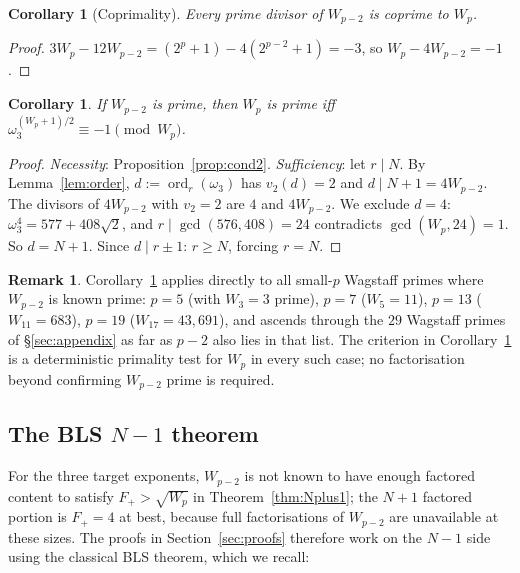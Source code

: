\documentclass[11pt,a4paper]{amsart}
\theoremstyle{plain}
\newtheorem{corollary}[theorem]{Corollary}
\theoremstyle{definition}
\newtheorem{remark}[theorem]{Remark}
\DeclareMathOperator{\ord}{ord}
\newcommand{\wom}{\omega_3}
\newcommand{\sqrttwo}{\sqrt{2}}
\begin{document}
\begin{corollary}[Coprimality]
\label{cor:coprime}
Every prime divisor of $W_{p-2}$ is coprime to $W_p$.
\end{corollary}

\begin{proof}
$3 W_p - 12 W_{p-2} = (2^p + 1) - 4(2^{p-2} + 1) = -3$, so $W_p - 4
W_{p-2} = -1$.
\end{proof}

\begin{corollary}
\label{cor:small-p-specialisation}
If $W_{p-2}$ is prime, then $W_p$ is prime iff $\wom^{(W_p + 1)/2}
\equiv -1 \pmod{W_p}$.
\end{corollary}

\begin{proof}
\emph{Necessity}: Proposition~\ref{prop:cond2}. \emph{Sufficiency}: let
$r \mid N$. By Lemma~\ref{lem:order}, $d := \ord_r(\wom)$ has
$v_2(d) = 2$ and $d \mid N+1 = 4 W_{p-2}$. The divisors of $4 W_{p-2}$
with $v_2 = 2$ are $4$ and $4 W_{p-2}$. We exclude $d = 4$: $\wom^4
= 577 + 408\sqrttwo$, and $r \mid \gcd(576, 408) = 24$ contradicts
$\gcd(W_p, 24) = 1$. So $d = N + 1$. Since $d \mid r \pm 1$: $r \geq
N$, forcing $r = N$.
\end{proof}

\begin{remark}
\label{rem:small-p}
Corollary~\ref{cor:small-p-specialisation} applies directly to all
small-$p$ Wagstaff primes where $W_{p-2}$ is known prime: $p = 5$
(with $W_3 = 3$ prime), $p = 7$ ($W_5 = 11$), $p = 13$ ($W_{11} =
683$), $p = 19$ ($W_{17} = 43{,}691$), and ascends through the $29$
Wagstaff primes of §\ref{sec:appendix} as far as $p - 2$ also lies
in that list. The criterion in
Corollary~\ref{cor:small-p-specialisation} is a deterministic
primality test for $W_p$ in every such case; no factorisation beyond
confirming $W_{p-2}$ prime is required.
\end{remark}

\subsection{The BLS $N-1$ theorem}

For the three target exponents, $W_{p-2}$ is not known to have enough
factored content to satisfy $F_+ > \sqrt{W_p}$ in
Theorem~\ref{thm:Nplus1}; the $N + 1$ factored portion is $F_+ = 4$ at
best, because full factorisations of $W_{p-2}$ are unavailable at
these sizes. The proofs in Section~\ref{sec:proofs} therefore work on
the $N - 1$ side using the classical BLS theorem, which we recall:
\end{document}

